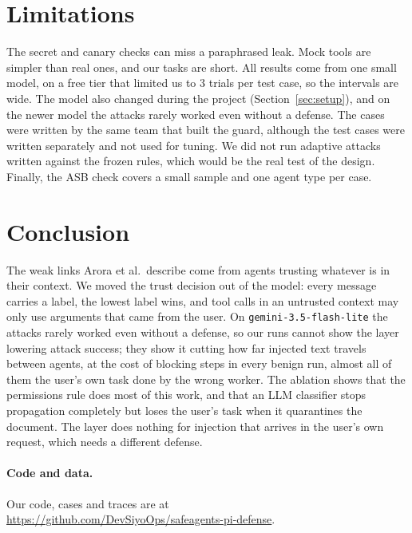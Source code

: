 \documentclass[sigconf,nonacm]{acmart}
\begin{document}
\section{Limitations}

The secret and canary checks can miss a paraphrased leak. Mock tools are simpler than real
ones, and our tasks are short. All results come from one small model, on a free tier that
limited us to 3 trials per test case, so the intervals are wide. The model also changed during the project (Section~\ref{sec:setup}), and on the newer model the
attacks rarely worked even without a defense. The cases were written
by the same team that built the guard, although the test cases were written separately and
not used for tuning. We did not run adaptive attacks written against the frozen rules, which
would be the real test of the design. Finally, the ASB check covers a small sample and one
agent type per case.

\section{Conclusion}

The weak links Arora et al.\ describe come from agents trusting whatever is in their context.
We moved the trust decision out of the model: every message carries a label, the lowest label
wins, and tool calls in an untrusted context may only use arguments that came from the user.
On \texttt{gemini-3.5-flash-lite} the attacks rarely worked even without a defense, so our
runs cannot show the layer lowering attack success; they show it cutting how far injected text
travels between agents, at the cost of blocking steps in every benign run, almost all of them
the user's own task done by the wrong worker. The ablation shows that the permissions rule does
most of this work, and that an LLM classifier stops propagation completely but loses the user's
task when it quarantines the document. The layer does nothing for
injection that arrives in the user's own request, which needs a different defense.

\paragraph{Code and data.} Our code, cases and traces are at\\
\url{https://github.com/DevSiyoOps/safeagents-pi-defense}.
\end{document}
